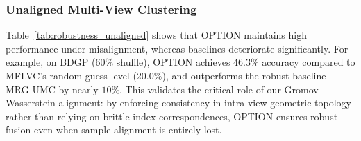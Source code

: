 \documentclass{article}
\theoremstyle{plain}
\theoremstyle{definition}
\theoremstyle{remark}
\begin{document}

\subsubsection{Unaligned Multi-View Clustering}
Table~\ref{tab:robustness_unaligned} shows that OPTION maintains high performance under misalignment, whereas baselines deteriorate significantly. For example, on BDGP ($60\%$ shuffle), OPTION achieves $46.3\%$ accuracy compared to MFLVC's random-guess level ($20.0\%$), and outperforms the robust baseline MRG-UMC by nearly $10\%$. This validates the critical role of our Gromov-Wasserstein alignment: by enforcing consistency in intra-view geometric topology rather than relying on brittle index correspondences, OPTION ensures robust fusion even when sample alignment is entirely lost.
\end{document}
